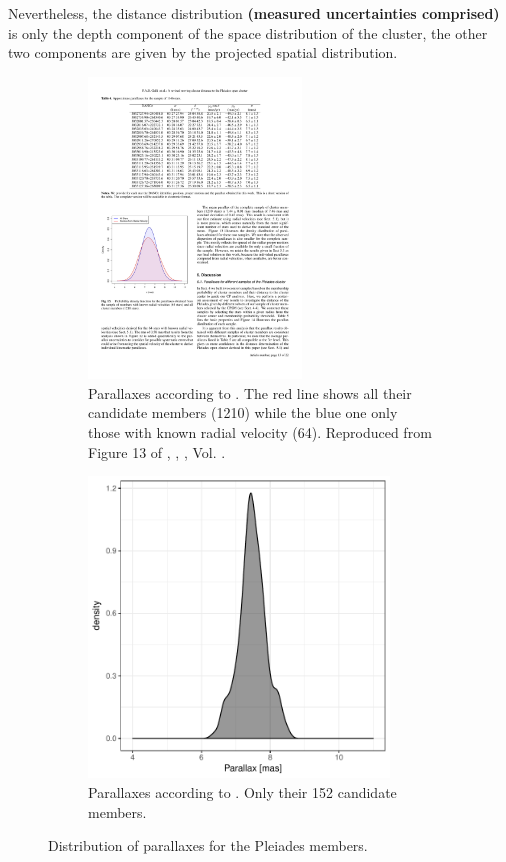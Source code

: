 Nevertheless, the distance distribution \textbf{(measured uncertainties comprised)} is only the depth component of the space distribution of the cluster, the other two components are given by the projected spatial distribution. 

\begin{figure}[ht!]
    \centering
    \begin{subfigure}[t]{\textwidth}
    \centering
        \includegraphics[height=8cm]{background/Figures/F13_Galli2017.pdf}
        \caption{Parallaxes according to \citet{Galli2017}. The red line shows all their candidate members (1210) while the blue one only those with known radial velocity (64). Reproduced from Figure 13 of \citet{Galli2017}, \textit{}, , Vol. .}
        \label{fig:parallaxPhillip}
    \end{subfigure}
    \begin{subfigure}[t]{\textwidth}
    \centering
       \includegraphics[height=8cm]{background/Figures/Parallax_GaiaCol2017.pdf}
        \caption{Parallaxes according to \citet{2017A&A...601A..19G}. Only their 152 candidate members.}
        \label{fig:parallaxTGAS} 
    \end{subfigure}
    \caption{Distribution of parallaxes for the Pleiades members.}
\end{figure}



